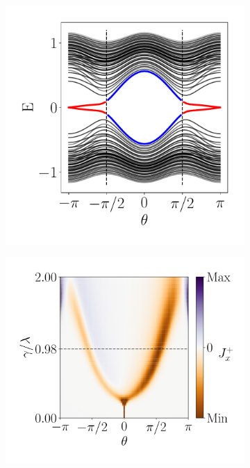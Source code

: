\begin{figure}[h!]
     \centering
    \captionsetup[sub]{font=small}
     \begin{minipage}[h!]{1\textwidth}
         \begin{subfigure}[b!]{0.3 \textwidth}
             \caption{}
             \includegraphics[width=\textwidth]{Imagenes/Resultados_pump_Cuadrado/xy/param_pump_A=0.5.pdf}
         \end{subfigure}\hspace*{-0.5em}
         \begin{subfigure}[b!]{0.35 \textwidth}
             \caption{}
             \includegraphics[width=\textwidth]{Imagenes/Resultados_pump_Cuadrado/xy/current_square_pump.pdf}

\end{subfigure}
\end{minipage}
\end{figure}
